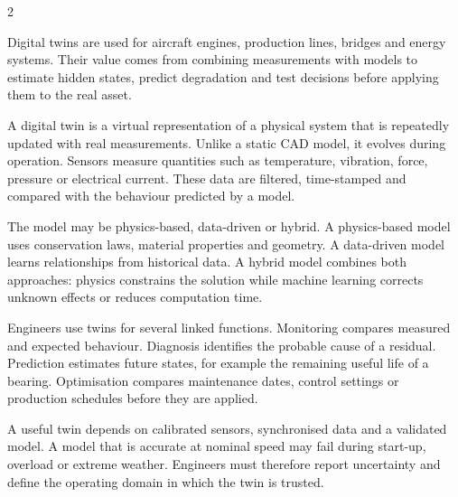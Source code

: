

\begin{multicols}{2}
\begin{engineeringnews}
Digital twins are used for aircraft engines, production lines, bridges and energy systems. Their value
comes from combining measurements with models to estimate hidden states, predict degradation and test
decisions before applying them to the real asset.
\end{engineeringnews}

\begin{ecarticle}
A digital twin is a virtual representation of a physical system that is repeatedly updated with real
measurements. Unlike a static CAD model, it evolves during operation. Sensors measure quantities such
as temperature, vibration, force, pressure or electrical current. These data are filtered,
time-stamped and compared with the behaviour predicted by a model.

The model may be physics-based, data-driven or hybrid. A physics-based model uses conservation laws,
material properties and geometry. A data-driven model learns relationships from historical data. A
hybrid model combines both approaches: physics constrains the solution while machine learning corrects
unknown effects or reduces computation time.

Engineers use twins for several linked functions. Monitoring compares measured and expected
behaviour. Diagnosis identifies the probable cause of a residual. Prediction estimates future states,
for example the remaining useful life of a bearing. Optimisation compares maintenance dates, control
settings or production schedules before they are applied.

A useful twin depends on calibrated sensors, synchronised data and a validated model. A model that is
accurate at nominal speed may fail during start-up, overload or extreme weather. Engineers must therefore
report uncertainty and define the operating domain in which the twin is trusted.


\end{ecarticle}
\end{multicols}
